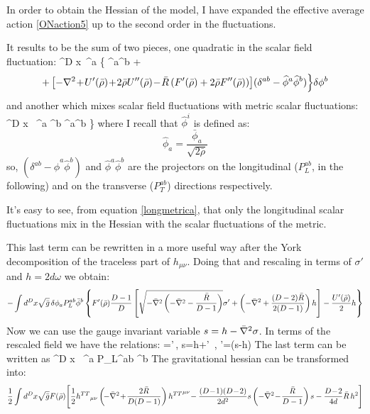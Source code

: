 In order to obtain the Hessian of the model, I have expanded the effective average action \eqref{ONaction5} up to the second order in the fluctuations.

It results to be the sum of two pieces, one quadratic in the scalar field fluctuation:
\be
\!\! ^D x \sqrt{\bg} 
\,\delta\phi^a \!\Big\{  \widehat{\phi}^{a}\widehat{\phi}^{b} +
\ee
\begin{equation}
 +\left[ -\nabla^2\!+\!U'(\bar \rho)\!+\!2\bar \rho U''(\bar \rho)\!-\!\bar R \left(F'(\bar \rho)+2\bar \rho F''(\bar \rho)\right) \right] \!(\delta^{ab} - \widehat{\phi}^{a}\widehat{\phi}^{b})\Big\} \delta\phi^b
\end{equation}
and another which mixes scalar field fluctuations with metric scalar fluctuations:
\be\label{longmetrica}
 ^D x \sqrt{\bg} \, \delta\phi^a  \bphi^b \widehat{\phi}^{a}\widehat{\phi}^{b}
\Bigr\}
\ee
where I recall that $\widehat{\phi}^{i}$ is defined as:
 $$\widehat{\phi}_{a} = \frac{\bar{\phi}_{a}}{\sqrt{2\bar{\rho}}}$$
so, $(\delta^{ab} - \widehat{\phi}^{a}\widehat{\phi}^{b})$ and $\widehat{\phi}^{a}\widehat{\phi}^{b}$ are the projectors on the longitudinal ($P_L^{ab}$, in the following) and on the transverse ($P_T^{ab}$) directions respectively.

It's easy to see, from equation \eqref{longmetrica}, that only the longitudinal scalar fluctuations mix in the Hessian with the scalar fluctuations of the metric.

This last term can be rewritten in a more useful way after the York decomposition of the traceless part of $h_{\mu\nu}$.
Doing that and rescaling in terms of $\sigma'$ and $h=2d\omega$ we obtain:
\begin{equation*}
- \int {d}^D x \sqrt{\bar g} \, \delta\phi_a P_L^{ab} \bar\phi^b \left\{ F'(\bar \rho)  \frac{D-1}{D} 
\left[ \sqrt{ -\bar\nabla^2 \left(-\bar\nabla^2 -\frac{\bar R}{D-1}\right) } \sigma' +\left(-\bar\nabla^2 +\frac{(D-2) \bar R}{2(D-1)} \right) h \right]- \frac{U'(\bar \rho)}{2} h \right\}
\end{equation*}
Now we can use the gauge invariant variable $s=h-\bar\nabla^2 \sigma$. In terms of the rescaled field we have the relations:
\be
\sigma=\sigma'\,, \quad s=h+\sigma' \,,\quad 
\sigma'=(s-h)
\ee
The last term can be written as
\be
 ^D x \sqrt{\bg} \, \delta\phi^a P_L^{ab} \bphi^b  
\ee
The gravitational hessian can be transformed into:
\begin{equation*}
\label{hessian2}
\frac{1}{2} \int {d}^D x\sqrt{\bg}F(\brho) \Biggl[
\frac{1}{2}\tth_{\mu\nu}\left(\!-\bnabla^2\!+\!\frac{2\bR}{D(D-1)}\right)\tth^{\mu\nu}
\!- \frac{(D\!-\!1)(D\!-\!2)}{2d^2} s \left(-\bnabla^2\!-\!\frac{\bR}{D-1}\right) s
- \frac{D\!-\!2}{4d} \bR \,h^2\Biggr]
\end{equation*}

